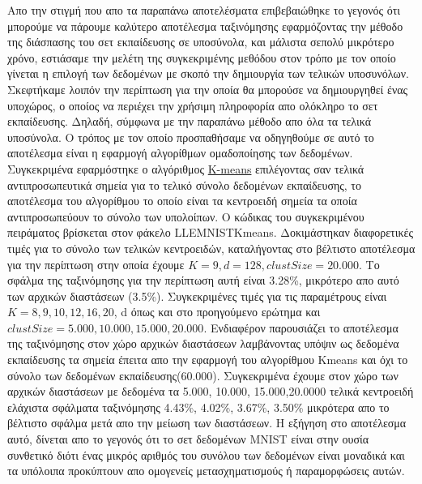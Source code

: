 Απο την στιγμή που απο τα παραπάνω αποτελέσματα επιβεβαιώθηκε το γεγονός ότι μπορούμε να πάρουμε καλύτερο αποτέλεσμα ταξινόμησης εφαρμόζοντας την μέθοδο της διάσπασης του σετ εκπαίδευσης σε υποσύνολα, και μάλιστα σεπολύ μικρότερο χρόνο, εστιάσαμε την μελέτη της συγκεκριμένης μεθόδου στον τρόπο με τον οποίο γίνεται η επιλογή των δεδομένων με σκοπό την δημιουργία των τελικών υποσυνόλων. Σκεφτήκαμε λοιπόν την περίπτωση για την οποία θα μπορούσε να δημιουργηθεί ένας υποχώρος, ο οποίος να περιέχει την χρήσιμη πληροφορία απο ολόκληρο το σετ εκπαίδευσης. Δηλαδή, σύμφωνα με την παραπάνω μέθοδο απο όλα τα τελικά υποσύνολα. Ο τρόπος με τον οποίο προσπαθήσαμε να οδηγηθούμε σε αυτό το αποτέλεσμα είναι η εφαρμογή αλγορίθμων ομαδοποίησης των δεδομένων. Συγκεκριμένα εφαρμόστηκε ο αλγόριθμος \href{https://en.wikipedia.org/wiki/K-means_clustering}{\textlatin{K-means}} επιλέγοντας σαν τελικά αντιπροσωπευτικά σημεία για το τελικό σύνολο δεδομένων εκπαίδευσης, το αποτέλεσμα του αλγορίθμου το οποίο είναι τα κεντροειδή σημεία τα οποία αντιπροσωπεύουν το σύνολο των υπολοίπων. Ο κώδικας του συγκεκριμένου πειράματος βρίσκεται στον φάκελο \textlatin{LLE\textunderscore MNIST\textunderscore Kmeans}. Δοκιμάστηκαν διαφορετικές τιμές για το σύνολο των τελικών κεντροειδών, καταλήγοντας στο βέλτιστο αποτέλεσμα για την περίπτωση στην οποία έχουμε $K=9, d=128, clustSize=20.000$. Το σφάλμα της ταξινόμησης για την περίπτωση αυτή είναι 3.28\%, μικρότερο απο αυτό των αρχικών διαστάσεων (3.5\%). Συγκεκριμένες τιμές για τις παραμέτρους είναι $K=8,9,10,12,16,20$, \textlatin{d} όπως και στο προηγούμενο ερώτημα και $clustSize=5.000, 10.000, 15.000, 20.000$. Ενδιαφέρον παρουσιάζει το αποτέλεσμα της ταξινόμησης στον χώρο αρχικών διαστάσεων λαμβάνοντας υπόψιν ως δεδομένα εκπαίδευσης τα σημεία έπειτα απο την εφαρμογή του αλγορίθμου \textlatin{Kmeans} και όχι το σύνολο των δεδομένων εκπαίδευσης(60.000). Συγκεκριμένα έχουμε στον χώρο των αρχικών διαστάσεων με δεδομένα τα 5.000, 10.000, 15.000,20.0000 τελικά κεντροειδή ελάχιστα σφάλματα ταξινόμησης 4.43\%, 4.02\%, 3.67\%, 3.50\% μικρότερα απο το βέλτιστο σφάλμα μετά απο την μείωση των διαστάσεων. Η εξήγηση στο αποτέλεσμα αυτό, δίνεται απο το γεγονός ότι το σετ δεδομένων \textlatin{MNIST} είναι στην ουσία συνθετικό διότι ένας μικρός αριθμός του συνόλου των δεδομένων είναι μοναδικά και τα υπόλοιπα προκύπτουν απο ομογενείς μετασχηματισμούς ή παραμορφώσεις αυτών.
\par
